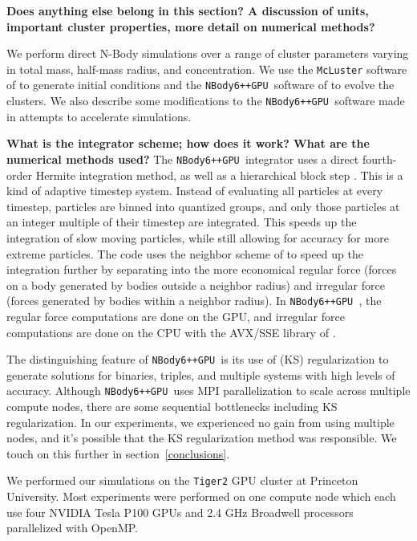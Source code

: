 \documentclass[preprint1]{aastex}
\newcommand\nbody{\texttt{NBody6++GPU }}
\numberwithin{equation}{section}
\begin{document}
\textbf{Does anything else belong in this section?  A discussion of units, important cluster properties, more detail on numerical methods?}

We perform direct N-Body simulations over a range of cluster parameters varying in total mass, half-mass radius, and concentration.  We use the \texttt{McLuster} software of \citet{2011Kupper} to generate initial conditions and the \nbody software of \citet{2015Wang} to evolve the clusters. We also describe some modifications to the \nbody software made in attempts to accelerate simulations.

\textbf{What is the integrator scheme; how does it work?  What are the numerical methods used?}
The \nbody integrator uses a direct fourth-order Hermite integration method, as well as a hierarchical block step \citep[][and refs within]{2015Wang}. This is a kind of adaptive timestep system. Instead of evaluating all particles at every timestep, particles are binned into quantized groups, and only those particles at an integer multiple of their timestep are integrated. This speeds up the integration of slow moving particles, while still allowing for accuracy for more extreme particles. The code uses the neighbor scheme of \citet{1973Ahmad} to speed up the integration further by separating into the more economical regular force (forces on a body generated by bodies outside a neighbor radius) and irregular force (forces generated by bodies within a neighbor radius). In \nbody, the regular force computations are done on the GPU, and irregular force computations are done on the CPU with the AVX/SSE library of \citet{2012Nitadori}.

The distinguishing feature of \nbody is its use of \citet{1965Kusta} (KS) regularization to generate solutions for binaries, triples, and multiple systems with high levels of accuracy. Although \nbody uses MPI parallelization to scale across multiple compute nodes, there are some sequential bottlenecks including KS regularization. In our experiments, we experienced no gain from using multiple nodes, and it's possible that the KS regularization method was responsible. We touch on this further in section~\ref{conclusions}.

We performed our simulations on the \texttt{Tiger2} GPU cluster at Princeton University. Most experiments were performed on one compute node which each use four NVIDIA Tesla P100 GPUs and 2.4 GHz Broadwell processors parallelized with OpenMP.
\end{document}
